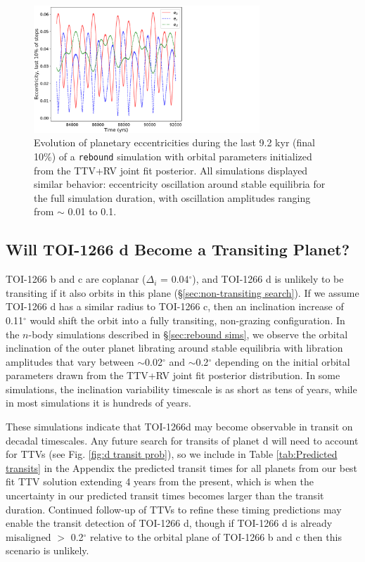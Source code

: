 \documentclass[twocolumn]{aastex631}
\begin{document}
\begin{figure}
  \includegraphics[width=8.5cm]{ecc_oscillation.pdf}
  \caption{Evolution of planetary eccentricities during the last 9.2 kyr (final 10\%) of a \texttt{rebound} simulation with orbital parameters initialized from the TTV+RV joint fit posterior. All simulations displayed similar behavior: eccentricity oscillation around stable equilibria for the full simulation duration, with oscillation amplitudes ranging from $\sim$ 0.01 to 0.1.}
  \label{fig:ecc_oscillation}
\end{figure}

\subsection{Will TOI-1266 d Become a Transiting Planet?} \label{sec:future d transits?}

TOI-1266 b and c are coplanar ($\Delta_i$ = 0.04$^{\circ}$), and TOI-1266 d is unlikely to be transiting if it also orbits in this plane (\S\ref{sec:non-transiting search}). If we assume TOI-1266 d has a similar radius to TOI-1266 c, then an inclination increase of 0.11$^{\circ}$ would shift the orbit into a fully transiting, non-grazing configuration. In the $n$-body simulations described in \S\ref{sec:rebound sims}, we observe the orbital inclination of the outer planet librating around stable equilibria with libration amplitudes that vary between $\sim$0.02$^{\circ}$ and $\sim$0.2$^{\circ}$ depending on the initial orbital parameters drawn from the TTV+RV joint fit posterior distribution. In some simulations, the inclination variability timescale is as short as tens of years, while in most simulations it is hundreds of years. 
 
These simulations indicate that TOI-1266d may become observable in transit on decadal timescales. Any future search for transits of planet d will need to account for TTVs (see Fig. \ref{fig:d transit prob}), so we include in Table \ref{tab:Predicted transits} in the Appendix the predicted transit times for all planets from our best fit TTV solution extending 4 years from the present, which is when the uncertainty in our predicted transit times becomes larger than the transit duration. Continued follow-up of TTVs to refine these timing predictions may enable the transit detection of TOI-1266 d, though if  TOI-1266 d is already misaligned $>$ 0.2$^{\circ}$ relative to the orbital plane of TOI-1266 b and c then this scenario is unlikely.
\end{document}
